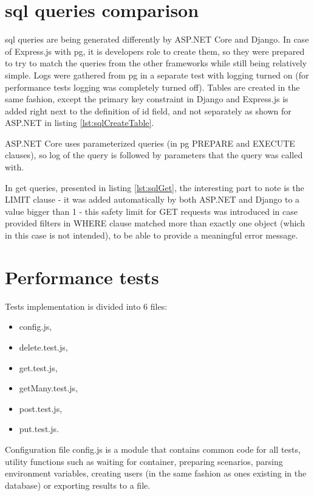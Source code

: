 %
%
\section{\acrshort{sql} queries comparison}
\acrshort{sql} queries are being generated differently by ASP.NET Core and Django. In case of Express.js with \acrlong{pg}, it is developers role to create them, so they were prepared to try to match the queries from the other frameworks while still being relatively simple. Logs were gathered from \acrlong{pg} in a separate test with logging turned on (for performance tests logging was completely turned off).
Tables are created in the same fashion, except the primary key constraint in Django and Express.js is added right next to the definition of id field, and not separately as shown for ASP.NET in listing \ref{lst:sqlCreateTable}.

ASP.NET Core uses parameterized queries (in \acrlong{pg} PREPARE and EXECUTE clauses), so log of the query is followed by parameters that the query was called with.

In get queries, presented in listing \ref{lst:sqlGet}, the interesting part to note is the LIMIT clause - it was added automatically by both ASP.NET and Django to a value bigger than 1 - this safety limit for GET requests was introduced in case provided filters in WHERE clause matched more than exactly one object (which in this case is not intended), to be able to provide a meaningful error message.







%
%
\section{Performance tests}
Tests implementation is divided into 6 files:
\begin{itemize}
    \item config.js,
    \item delete.test.js,
    \item get.test.js,
    \item getMany.test.js,
    \item post.test.js,
    \item put.test.js.
\end{itemize}
Configuration file config.js is a module that contains common code for all tests, utility functions such as waiting for container, preparing scenarios, parsing environment variables, creating users (in the same fashion as ones existing in the database) or exporting results to a file.

